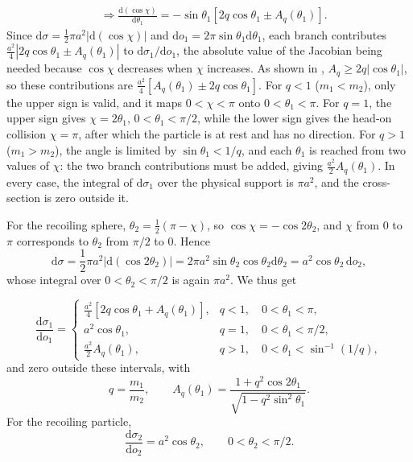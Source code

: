 \begin{problem}[title={Scattering by a perfectly rigid sphere}]
{\begin{align*}
    &\Rightarrow \frac{\mathrm{d}(\cos{\chi})}{\mathrm{d}\theta_1} = -\sin{\theta_1}\left[ 2q\cos{\theta_1} \pm A_q(\theta_1) \right].
\end{align*}
Since $\mathrm{d}\sigma = \frac{1}{2}\pi a^2|\mathrm{d}(\cos{\chi})|$ and $\mathrm{d}o_1 = 2\pi\sin{\theta_1}\mathrm{d}\theta_1$, each branch contributes $\frac{a^2}{4}\left|2q\cos{\theta_1} \pm A_q(\theta_1)\right|$ to $\mathrm{d}\sigma_1/\mathrm{d}o_1$, the absolute value of the Jacobian being needed because $\cos{\chi}$ decreases when $\chi$ increases. As shown in , $A_q \geq 2q|\cos{\theta_1}|$, so these contributions are $\frac{a^2}{4}\left[A_q(\theta_1) \pm 2q\cos{\theta_1}\right]$. For $q<1$ ($m_1<m_2$), only the upper sign is valid, and it maps $0<\chi<\pi$ onto $0<\theta_1<\pi$. For $q=1$, the upper sign gives $\chi = 2\theta_1$, $0<\theta_1<\pi/2$, while the lower sign gives the head-on collision $\chi=\pi$, after which the particle is at rest and has no direction. For $q>1$ ($m_1>m_2$), the angle is limited by $\sin{\theta_1} < 1/q$, and each $\theta_1$ is reached from two values of $\chi$: the two branch contributions must be added, giving $\frac{a^2}{2}A_q(\theta_1)$. In every case, the integral of $\mathrm{d}\sigma_1$ over the physical support is $\pi a^2$, and the cross-section is zero outside it.

For the recoiling sphere, $\theta_2 = \frac{1}{2}(\pi-\chi)$, so $\cos{\chi} = -\cos{2\theta_2}$, and $\chi$ from $0$ to $\pi$ corresponds to $\theta_2$ from $\pi/2$ to $0$. Hence
\begin{equation*}
    \mathrm{d}\sigma = \frac{1}{2}\pi a^2 \left|\mathrm{d}(\cos{2\theta_2})\right| = 2\pi a^2 \sin{\theta_2}\cos{\theta_2}\mathrm{d}\theta_2 = a^2\cos{\theta_2}\,\mathrm{d}o_2,
\end{equation*}
whose integral over $0<\theta_2<\pi/2$ is again $\pi a^2$. We thus get
}
{
\begin{equation*}
    \frac{\mathrm{d}\sigma_1}{\mathrm{d}o_1} =
    \begin{cases}
        \frac{a^2}{4}\left[2q\cos{\theta_1} + A_q(\theta_1)\right], & q<1, \quad 0<\theta_1<\pi, \\[1mm]
        a^2\cos{\theta_1}, & q=1, \quad 0<\theta_1<\pi/2, \\[1mm]
        \frac{a^2}{2}A_q(\theta_1), & q>1, \quad 0<\theta_1<\sin^{-1}(1/q),
    \end{cases}
\end{equation*}
and zero outside these intervals, with
\begin{equation*}
    q = \frac{m_1}{m_2}, \qquad A_q(\theta_1) = \frac{1+q^2\cos{2\theta_1}}{\sqrt{1-q^2\sin^2{\theta_1}}}.
\end{equation*}
For the recoiling particle,
\begin{equation*}
    \frac{\mathrm{d}\sigma_2}{\mathrm{d}o_2} = a^2\cos{\theta_2}, \qquad 0<\theta_2<\pi/2.
\end{equation*}
}
\end{problem}

